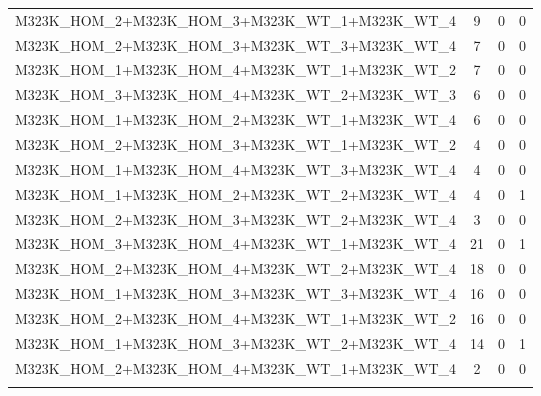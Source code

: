 \begin{appendices}
\begin{table}[!htbp]
\begin{tabular}{@{\extracolsep{5pt}} cccc}
		M323K\_HOM\_2+M323K\_HOM\_3+M323K\_WT\_1+M323K\_WT\_4 & 9 & 0 & 0 \\ 
		M323K\_HOM\_2+M323K\_HOM\_3+M323K\_WT\_3+M323K\_WT\_4 & 7 & 0 & 0 \\ 
		M323K\_HOM\_1+M323K\_HOM\_4+M323K\_WT\_1+M323K\_WT\_2 & 7 & 0 & 0 \\ 
		M323K\_HOM\_3+M323K\_HOM\_4+M323K\_WT\_2+M323K\_WT\_3 & 6 & 0 & 0 \\ 
		M323K\_HOM\_1+M323K\_HOM\_2+M323K\_WT\_1+M323K\_WT\_4 & 6 & 0 & 0 \\ 
		M323K\_HOM\_2+M323K\_HOM\_3+M323K\_WT\_1+M323K\_WT\_2 & 4 & 0 & 0 \\ 
		M323K\_HOM\_1+M323K\_HOM\_4+M323K\_WT\_3+M323K\_WT\_4 & 4 & 0 & 0 \\ 
		M323K\_HOM\_1+M323K\_HOM\_2+M323K\_WT\_2+M323K\_WT\_4 & 4 & 0 & 1 \\ 
		M323K\_HOM\_2+M323K\_HOM\_3+M323K\_WT\_2+M323K\_WT\_4 & 3 & 0 & 0 \\ 
		M323K\_HOM\_3+M323K\_HOM\_4+M323K\_WT\_1+M323K\_WT\_4 & 21 & 0 & 1 \\ 
		M323K\_HOM\_2+M323K\_HOM\_4+M323K\_WT\_2+M323K\_WT\_4 & 18 & 0 & 0 \\ 
		M323K\_HOM\_1+M323K\_HOM\_3+M323K\_WT\_3+M323K\_WT\_4 & 16 & 0 & 0 \\ 
		M323K\_HOM\_2+M323K\_HOM\_4+M323K\_WT\_1+M323K\_WT\_2 & 16 & 0 & 0 \\ 
		M323K\_HOM\_1+M323K\_HOM\_3+M323K\_WT\_2+M323K\_WT\_4 & 14 & 0 & 1 \\ 
		M323K\_HOM\_2+M323K\_HOM\_4+M323K\_WT\_1+M323K\_WT\_4 & 2 & 0 & 0 \\ 
		\hline \\[-1.8ex] 
	\end{tabular} 
\end{table} 


\end{appendices}
